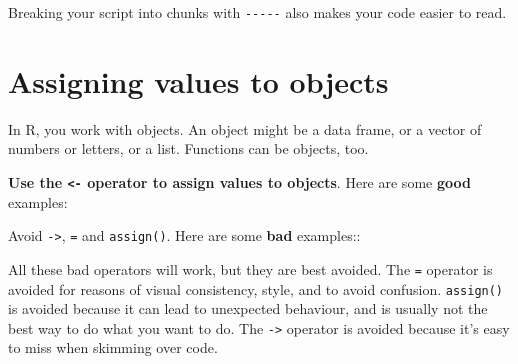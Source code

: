 \documentclass[]{book}
\newenvironment{Shaded}{\begin{snugshade}}{\end{snugshade}}
\newcommand{\KeywordTok}[1]{\textcolor[rgb]{0.13,0.29,0.53}{\textbf{#1}}}
\newcommand{\NormalTok}[1]{#1}
\newcommand{\OperatorTok}[1]{\textcolor[rgb]{0.81,0.36,0.00}{\textbf{#1}}}
\newcommand{\StringTok}[1]{\textcolor[rgb]{0.31,0.60,0.02}{#1}}
\begin{document}
Breaking your script into chunks with \texttt{-\/-\/-\/-\/-} also makes your code easier to read.

\hypertarget{assigning-values-to-objects}{%
\section{Assigning values to objects}\label{assigning-values-to-objects}}

In R, you work with objects. An object might be a data frame, or a vector of numbers or letters, or a list. Functions can be objects, too.

\textbf{Use the \texttt{\textless{}-} operator to assign values to objects}. Here are some \textbf{good} examples:

\begin{Shaded}
\end{Shaded}

Avoid \texttt{-\textgreater{}}, \texttt{=} and \texttt{assign()}. Here are some \textbf{bad} examples::

\begin{Shaded}
\end{Shaded}

All these bad operators will work, but they are best avoided. The \texttt{=} operator is avoided for reasons of visual consistency, style, and to avoid confusion. \texttt{assign()} is avoided because it can lead to unexpected behaviour, and is usually not the best way to do what you want to do. The \texttt{-\textgreater{}} operator is avoided because it's easy to miss when skimming over code.
\end{document}
